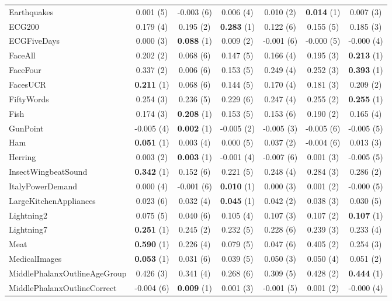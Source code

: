 \begin{table}[ht]
\begin{adjustbox}{width=\textwidth}
\begin{tabular}{lcccccc}
Earthquakes & 0.001 (5) & -0.003 (6) & 0.006 (4) & 0.010 (2) & \textbf{0.014} (1) & 0.007 (3) \\
ECG200 & 0.179 (4) & 0.195 (2) & \textbf{0.283} (1) & 0.122 (6) & 0.155 (5) & 0.185 (3) \\
ECGFiveDays & 0.000 (3) & \textbf{0.088} (1) & 0.009 (2) & -0.001 (6) & -0.000 (5) & -0.000 (4) \\
FaceAll & 0.202 (2) & 0.068 (6) & 0.147 (5) & 0.166 (4) & 0.195 (3) & \textbf{0.213} (1) \\
FaceFour & 0.337 (2) & 0.006 (6) & 0.153 (5) & 0.249 (4) & 0.252 (3) & \textbf{0.393} (1) \\
FacesUCR & \textbf{0.211} (1) & 0.068 (6) & 0.144 (5) & 0.170 (4) & 0.181 (3) & 0.209 (2) \\
FiftyWords & 0.254 (3) & 0.236 (5) & 0.229 (6) & 0.247 (4) & 0.255 (2) & \textbf{0.255} (1) \\
Fish & 0.174 (3) & \textbf{0.208} (1) & 0.153 (5) & 0.153 (6) & 0.190 (2) & 0.165 (4) \\
GunPoint & -0.005 (4) & \textbf{0.002} (1) & -0.005 (2) & -0.005 (3) & -0.005 (6) & -0.005 (5) \\
Ham & \textbf{0.051} (1) & 0.003 (4) & 0.000 (5) & 0.037 (2) & -0.004 (6) & 0.013 (3) \\
Herring & 0.003 (2) & \textbf{0.003} (1) & -0.001 (4) & -0.007 (6) & 0.001 (3) & -0.005 (5) \\
InsectWingbeatSound & \textbf{0.342} (1) & 0.152 (6) & 0.221 (5) & 0.248 (4) & 0.284 (3) & 0.286 (2) \\
ItalyPowerDemand & 0.000 (4) & -0.001 (6) & \textbf{0.010} (1) & 0.000 (3) & 0.001 (2) & -0.000 (5) \\
LargeKitchenAppliances & 0.023 (6) & 0.032 (4) & \textbf{0.045} (1) & 0.042 (2) & 0.038 (3) & 0.030 (5) \\
Lightning2 & 0.075 (5) & 0.040 (6) & 0.105 (4) & 0.107 (3) & 0.107 (2) & \textbf{0.107} (1) \\
Lightning7 & \textbf{0.251} (1) & 0.245 (2) & 0.232 (5) & 0.228 (6) & 0.239 (3) & 0.233 (4) \\
Meat & \textbf{0.590} (1) & 0.226 (4) & 0.079 (5) & 0.047 (6) & 0.405 (2) & 0.254 (3) \\
MedicalImages & \textbf{0.053} (1) & 0.031 (6) & 0.039 (5) & 0.050 (3) & 0.050 (4) & 0.051 (2) \\
MiddlePhalanxOutlineAgeGroup & 0.426 (3) & 0.341 (4) & 0.268 (6) & 0.309 (5) & 0.428 (2) & \textbf{0.444} (1) \\
MiddlePhalanxOutlineCorrect & -0.004 (6) & \textbf{0.009} (1) & 0.001 (3) & -0.001 (5) & 0.001 (2) & -0.000 (4) \\

\end{tabular}
\end{adjustbox}
\end{table}
